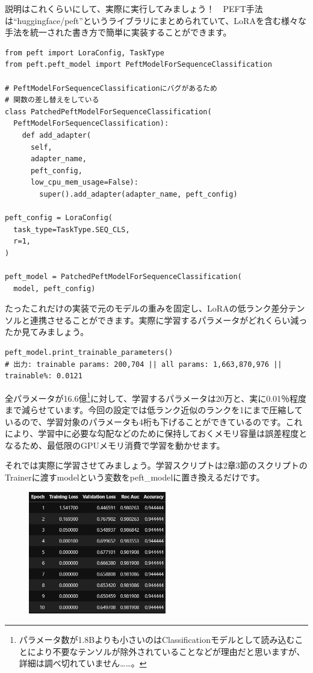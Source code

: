 \documentclass[a5paper,twoside,dvipdfmx]{jsarticle}
\begin{document}
説明はこれくらいにして、実際に実行してみましょう！　PEFT手法は``huggingface/peft''というライブラリにまとめられていて、LoRAを含む様々な手法を統一された書き方で簡単に実装することができます。

\begin{lstlisting}
from peft import LoraConfig, TaskType
from peft.peft_model import PeftModelForSequenceClassification

# PeftModelForSequenceClassificationにバグがあるため
# 関数の差し替えをしている
class PatchedPeftModelForSequenceClassification(
  PeftModelForSequenceClassification):
    def add_adapter(
      self,
      adapter_name,
      peft_config, 
      low_cpu_mem_usage=False):
        super().add_adapter(adapter_name, peft_config)

peft_config = LoraConfig(
  task_type=TaskType.SEQ_CLS,
  r=1,
)

peft_model = PatchedPeftModelForSequenceClassification(
  model, peft_config)
\end{lstlisting}

たったこれだけの実装で元のモデルの重みを固定し、LoRAの低ランク差分テンソルと連携させることができます。実際に学習するパラメータがどれくらい減ったか見てみましょう。

\begin{lstlisting}
peft_model.print_trainable_parameters()
# 出力: trainable params: 200,704 || all params: 1,663,870,976 || trainable%: 0.0121
\end{lstlisting}

全パラメータが16.6億\footnote{パラメータ数が1.8Bよりも小さいのはClassificationモデルとして読み込むことにより不要なテンソルが除外されていることなどが理由だと思いますが、詳細は調べ切れていません……。}に対して、学習するパラメータは20万と、実に0.01％程度まで減らせています。今回の設定では低ランク近似のランクを1にまで圧縮しているので、学習対象のパラメータも4桁も下げることができているのです。これにより、学習中に必要な勾配などのために保持しておくメモリ容量は誤差程度となるため、最低限のGPUメモリ消費で学習を動かせます。

それでは実際に学習させてみましょう。学習スクリプトは2章3節のスクリプトのTrainerに渡すmodelという変数をpeft\_modelに置き換えるだけです。

\begin{figure}[h]
  \centering
  \includegraphics[width=60mm]{../C105Fig/gray/lora_train.png}
 \end{figure} 
\end{document}
